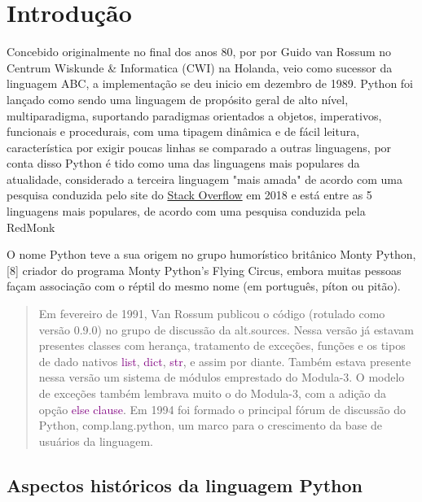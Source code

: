 


\chapter{ Introdu\c{c}\~{a}o}
Concebido originalmente no final dos anos 80, por por Guido van Rossum no Centrum Wiskunde \& Informatica (CWI) na Holanda, veio como sucessor da linguagem ABC, a implementação se deu inicio em dezembro de 1989. Python foi lançado como sendo uma linguagem de propósito geral de alto nível, multiparadigma, suportando paradigmas orientados a objetos, imperativos, funcionais e procedurais, com uma tipagem dinâmica e de fácil leitura, característica por exigir poucas linhas se comparado a outras linguagens, por conta disso Python é tido como uma das linguagens mais populares da atualidade, considerado a terceira linguagem "mais amada" de acordo com uma pesquisa conduzida pelo site do \href{https://stackoverflow.com/}{Stack Overflow} em 2018 e está entre as 5 linguagens mais populares, de acordo com uma pesquisa conduzida pela RedMonk 

O nome Python teve a sua origem no grupo humorístico britânico Monty Python,[8] criador do programa Monty Python's Flying Circus, embora muitas pessoas façam associação com o réptil do mesmo nome (em português, píton ou pitão).

\begin{quote}
  Em fevereiro de 1991, Van Rossum publicou o código (rotulado como versão 0.9.0) no grupo de discussão da alt.sources. Nessa versão já estavam presentes classes com herança, tratamento de exceções, funções e os tipos de dado nativos \textcolor{purple}{list}, \textcolor{purple}{dict}, \textcolor{purple}{str}, e assim por diante. Também estava presente nessa versão um sistema de módulos emprestado do Modula-3. O modelo de exceções também lembrava muito o do Modula-3, com a adição da opção \textcolor{purple}{else clause}.
  Em 1994 foi formado o principal fórum de discussão do Python, comp.lang.python, um marco para o crescimento da base de usuários da linguagem. \cite{Int01}
\end{quote}


   \section{Aspectos hist\'{o}ricos da linguagem Python}
        
